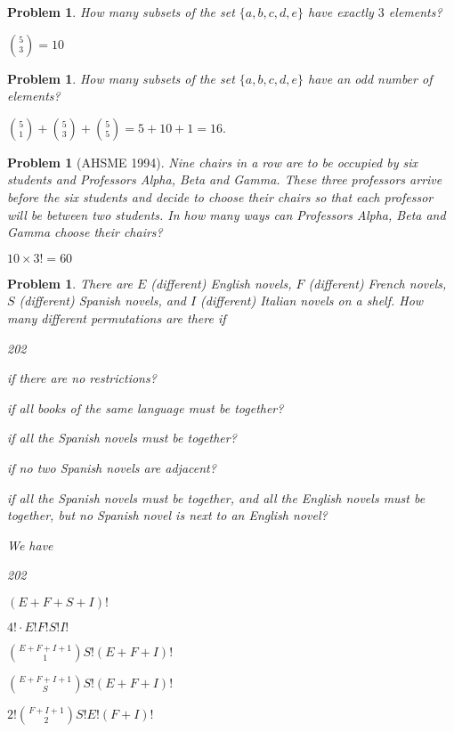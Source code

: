 \documentclass[11pt, openany]{book}
\theoremstyle{change} \theoremheaderfont{\blue\sffamily\bfseries}
\newtheorem{pro}[thm]{Problem}
\theoremstyle{nonumberplain} \theoremheaderfont{\sffamily\bfseries}
\def\binom#1#2{{#1\choose#2}}
\newcommand{\dis}{\displaystyle}
\newcommand{\í}{\'{\i}}
\begin{document}
\begin{multicols}{2}
\begin{pro}
How many subsets of the set $\{a,b,c,d,e\}$ have exactly $3$
elements? \begin{answer} $\dis{\binom{5}{3} = 10}$\end{answer}
\end{pro}

\begin{pro}How many subsets of the set $\{a,b,c,d,e\}$ have an odd number of
elements? \begin{answer} $\binom{5}{1} + \binom{5}{3} + \binom{5}{5}
= 5 + 10 + 1 = 16.$\end{answer}
\end{pro}


    \begin{pro}[AHSME 1994] Nine chairs in a row are to be occupied by
six students and Professors Alpha, Beta and Gamma. These three
professors arrive before the six students and decide to choose their
chairs so that each professor will be between two students. In how
many ways can Professors Alpha, Beta and Gamma choose their chairs?
\begin{answer}  $10\times 3! = 60$
\end{answer}
  \end{pro}
    \begin{pro}
There are $E$ (different) English novels, $F$ (different) French
novels, $S$ (different) Spanish novels, and $I$ (different) Italian
novels on a shelf. How many different permutations are there if
\begin{dingautolist}{202}
\item if there are no restrictions?

\item if all books of the same language must be together?

\item if all the Spanish novels must be together? \item if no two
Spanish novels are adjacent?


\item if all the Spanish novels must be together, and all the
English novels must be together, but no Spanish novel is next to an
English novel?


\end{dingautolist}
\begin{answer}We have
\begin{dingautolist}{202}
\item $(E + F + S + I)!$\item  $4!\cdot E!F!S!I!$\item
 $\binom{E+F+I+1}{1}S!(E + F+ I)!$\item  $\binom{E+F+I+1}{S}S!(E + F+ I)!$\item
  $2!\binom{F+I+1}{2}S!E!(F+ I)!$ \end{dingautolist}
\end{answer}
 \end{pro}


\end{multicols}
\end{document}
